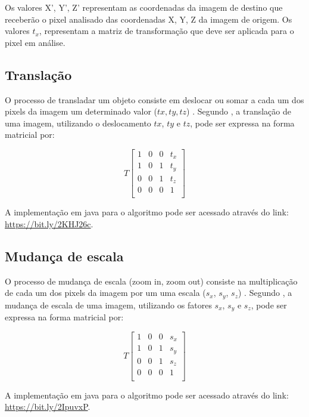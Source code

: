 \documentclass[
	12pt,				%
	oneside,			%
	a4paper,			%
	english,			%
	french,				%
	spanish,			%
	brazil,				%
	]{abntex2}
\begin{document}
Os valores X’, Y’, Z' representam as coordenadas da imagem de destino que receberão o pixel analisado das coordenadas X, Y, Z da imagem de origem. Os valores \(t_x\), representam a matriz de transformação que deve ser aplicada para o pixel em análise.

\subsection{Translação}

O processo de transladar um objeto consiste em deslocar ou somar a cada um dos pixels da imagem um determinado valor (\(tx, ty, tz\)) \cite{conciAzevedoLeta:2008}. Segundo \citet{pedriniSchwartz:2008}, a translação de uma imagem, utilizando o deslocamento \(tx\), \(ty\) e \(tz\), pode ser expressa na forma matricial por:

\[
T
\begin{bmatrix}
    1 & 0 & 0 & t_x   \\ 
    1 & 0 & 1 & t_y   \\    
    0 & 0 & 1 & t_z   \\    
    0 & 0 & 0 & 1   \\  
\end{bmatrix} 
\]

A implementação em java para o algoritmo pode ser acessado através do link: \url{https://bit.ly/2KHJ26c}.

\subsection{Mudança de escala}

O processo de mudança de escala (zoom in, zoom out) consiste na multiplicação de cada um dos pixels da imagem por um uma escala (\(s_x\), \(s_y\), \(s_z\))  \cite{conciAzevedoLeta:2008}. Segundo \citet{pedriniSchwartz:2008}, a mudança de escala de uma imagem, utilizando os fatores \(s_x\), \(s_y\) e \(s_z\), pode ser expressa na forma matricial por:

\[
T
\begin{bmatrix}
    1 & 0 & 0 & s_x   \\ 
	1 & 0 & 1 & s_y   \\ 
	0 & 0 & 1 & s_z   \\ 
	0 & 0 & 0 & 1     \\ 
\end{bmatrix} 
\]

A implementação em java para o algoritmo pode ser acessado através do link: \url{https://bit.ly/2IpuvxP}.
\end{document}
